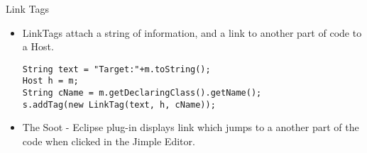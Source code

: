\begin{slide}{Link Tags}
\begin{itemize}
\item {\red LinkTag}s attach a string of information, and a link to another part of code to a {\red Host}.
{\scriptsize
\begin{verbatim}
String text = "Target:"+m.toString();
Host h = m;
String cName = m.getDeclaringClass().getName();
s.addTag(new LinkTag(text, h, cName));
\end{verbatim}
}
\item The Soot - Eclipse plug-in displays link which jumps to a another part of the code when clicked in the Jimple Editor.
\end{itemize}
\end{slide}

